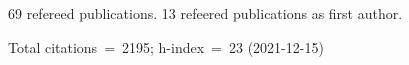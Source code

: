 69 refereed publications. 13 refeered publications as first author.

Total citations~=~2195; h-index~=~23 (2021-12-15)
